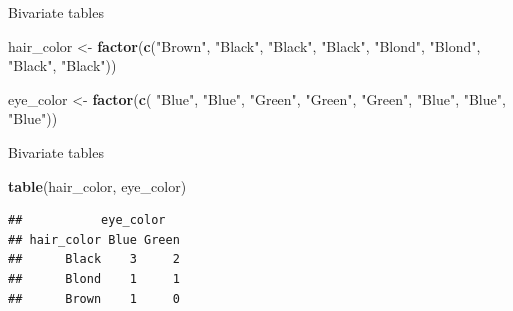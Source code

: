 \documentclass[ignorenonframetext,]{beamer}
\newenvironment{Shaded}{\begin{snugshade}}{\end{snugshade}}
\newcommand{\KeywordTok}[1]{\textcolor[rgb]{0.13,0.29,0.53}{\textbf{#1}}}
\newcommand{\NormalTok}[1]{#1}
\newcommand{\StringTok}[1]{\textcolor[rgb]{0.31,0.60,0.02}{#1}}
\begin{document}
\begin{frame}[fragile]{Bivariate tables}
\protect\hypertarget{bivariate-tables}{}

\begin{Shaded}
\begin{Highlighting}[]
\NormalTok{hair_color <-}\StringTok{ }\KeywordTok{factor}\NormalTok{(}\KeywordTok{c}\NormalTok{(}\StringTok{"Brown"}\NormalTok{, }\StringTok{"Black"}\NormalTok{, }\StringTok{"Black"}\NormalTok{, }
                         \StringTok{"Black"}\NormalTok{, }\StringTok{"Blond"}\NormalTok{, }\StringTok{"Blond"}\NormalTok{, }
                         \StringTok{"Black"}\NormalTok{, }\StringTok{"Black"}\NormalTok{))}
                         
\NormalTok{eye_color <-}\StringTok{ }\KeywordTok{factor}\NormalTok{(}\KeywordTok{c}\NormalTok{( }\StringTok{"Blue"}\NormalTok{, }\StringTok{"Blue"}\NormalTok{, }\StringTok{"Green"}\NormalTok{,}
                         \StringTok{"Green"}\NormalTok{, }\StringTok{"Green"}\NormalTok{, }\StringTok{"Blue"}\NormalTok{, }
                         \StringTok{"Blue"}\NormalTok{, }\StringTok{"Blue"}\NormalTok{))}
\end{Highlighting}
\end{Shaded}

\end{frame}

\begin{frame}[fragile]{Bivariate tables}
\protect\hypertarget{bivariate-tables-1}{}

\begin{Shaded}
\begin{Highlighting}[]
\KeywordTok{table}\NormalTok{(hair_color, eye_color)}
\end{Highlighting}
\end{Shaded}

\begin{verbatim}
##           eye_color
## hair_color Blue Green
##      Black    3     2
##      Blond    1     1
##      Brown    1     0
\end{verbatim}

\end{frame}
\end{document}

